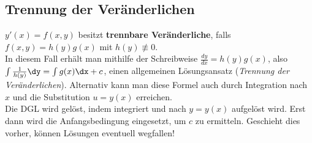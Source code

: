 \subsection{%
    Trennung der Veränderlichen%
}

$y'(x) = f(x, y)$ besitzt \textbf{trennbare Veränderliche}, falls
$f(x, y) = h(y) g(x)$ mit $h(y) \not\equiv 0$. \\
In diesem Fall erhält man mithilfe der Schreibweise
$\frac{dy}{dx} = h(y)g(x)$, also $\int \frac{1}{h(y)}\dy = \int g(x)\dx + c$,
einen allgemeinen Lösungsansatz (\emph{Trennung der Veränderlichen}).
Alternativ kann man diese Formel auch durch Integration nach $x$ und
die Substitution $u = y(x)$ erreichen. \\
Die DGL wird gelöst, indem integriert und nach $y = y(x)$ aufgelöst wird.
Erst dann wird die Anfangsbedingung eingesetzt, um $c$ zu ermitteln.
Geschieht dies vorher, können Lösungen eventuell wegfallen!

